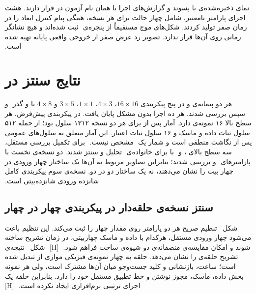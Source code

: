 ‫نمای ذخیره‌شده‌ی  با پسوند  و گزارش‌های اجرا با همان نام آزمون
‫در  قرار دارند. هشت اجرای پارامتر نامعتبر، شامل چهار حالت برای هر نسخه،
‫همگی پیام کنترل ابعاد را در زمان صفر تولید کردند. شکل‌های موج مستقیماً از پنجره‌ی
‫ ثبت شده‌اند و هیچ نشانگر زمانی روی آن‌ها قرار ندارد. تصویر رد عرض صفر
‫از خروجی واقعی پایانه تهیه شده است.
‫
‫\section{نتایج سنتز در }
‫
‫هر دو پیمانه‌ی  و  در پنج پیکربندی $16\times16$،
‫$4\times3$، $1\times1$، $3\times5$ و $4\times8$ با  و گذر
‫ و سپس  بررسی شدند. هر ده اجرا بدون مشکل پایان یافت.
‫در پیکربندی پیش‌فرض، هر سطح بالا ۱۶ نمونه‌ی  دارد.
‫آمار پس از  برای هر دو نسخه ۱۳۱۲ سلول بود؛ از جمله ۵۱۲ سلول ثبات داده و
‫ماسک و ۱۶ سلول ثبات اعتبار. این آمار متعلق به سلول‌های عمومی  پس از
‫نگاشت منطقی است و شمار  یک
‫ مشخص نیست.
‫
‫برای تکمیل بررسی مستقل، سه سطح بالای ،  و
‫ با  برای خانواده‌ی
‫ تحلیل و سنتز شدند. دو نسخه‌ی نخست با پارامترهای
‫ و  بررسی شدند؛ بنابراین تصاویر مربوط به آن‌ها
‫یک ساختار چهار ورودی در چهار بیت را نشان می‌دهند، نه یک ساختار دو در دو. نسخه‌ی سوم
‫پیکربندی کامل شانزده ورودی شانزده‌بیتی است.
‫
‫\subsection{سنتز نسخه‌ی حلقه‌دار در پیکربندی چهار در چهار}
‫
‫شکل~ تنظیم صریح هر دو پارامتر روی مقدار چهار را ثبت
‫می‌کند. این تنظیم باعث می‌شود چهار ورودی مستقل، هرکدام با داده و ماسک چهار‌بیتی، در زمان
‫تشریح ساخته شوند و امکان مقایسه‌ی منصفانه‌ی دو شیوه‌ی ساخت فراهم شود.
‫
‫[H]
‫
‫
‫
‫
‫
‫شکل~ نتیجه‌ی تشریح حلقه‌ی  را نشان
‫می‌دهد. حلقه به چهار نمونه‌ی فیزیکی موازی از  تبدیل شده است؛ ساعت،
‫بازنشانی و کلید جست‌وجو میان آن‌ها مشترک است، ولی هر نمونه بخش داده، ماسک، مجوز نوشتن
‫و خط تطبیق مستقل خود را دارد. بنابراین حلقه یک اجرای ترتیبی نرم‌افزاری ایجاد نکرده است.
‫
‫[H]
‫
